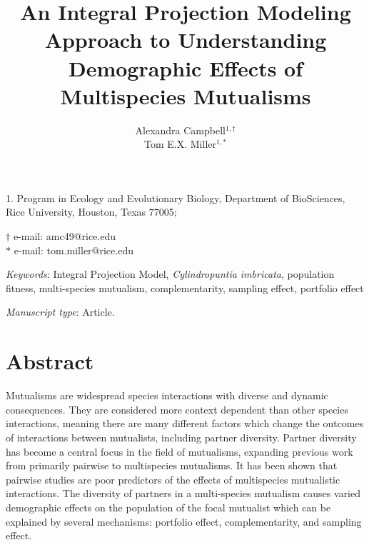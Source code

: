 \documentclass[11pt]{article}
\title{An Integral Projection Modeling Approach to Understanding Demographic Effects of Multispecies Mutualisms}
\author{Alexandra Campbell$^{1,\dagger}$ \\ 
	Tom E.X. Miller$^{1,\ast}$}
\date{}
\begin{document}
	
	\maketitle
	
	\noindent{} 1. Program in Ecology and Evolutionary Biology, Department of BioSciences, Rice University, Houston, Texas 77005;
	
	\noindent{} $\dagger$ e-mail: amc49@rice.edu\\
	\noindent{} $\ast$ e-mail: tom.miller@rice.edu
	
	\bigskip
	
	\textit{Keywords}:  Integral Projection Model, \textit{Cylindropuntia imbricata}, population fitness, multi-species mutualism, complementarity, sampling effect, portfolio effect
	
	\bigskip
	
	\textit{Manuscript type}: Article.
	
	\bigskip
	
	
\linenumbers{}
\modulolinenumbers[3]

\newpage{}

\section*{Abstract}
Mutualisms are widespread species interactions with diverse and dynamic consequences. 
They are considered more context dependent than other species interactions, meaning there are many different factors which change the outcomes of interactions between mutualists, including partner diversity. 
Partner diversity has become a central focus in the field of mutualisms, expanding previous work from primarily pairwise to multispecies mutualisms. 
It has been shown that pairwise studies are poor predictors of the effects of multispecies mutualistic interactions. 
The diversity of partners in a multi-species mutualism causes varied demographic effects on the population of the focal mutualist which can be explained by several mechanisms: portfolio effect, complementarity, and sampling effect. 
\end{document}
